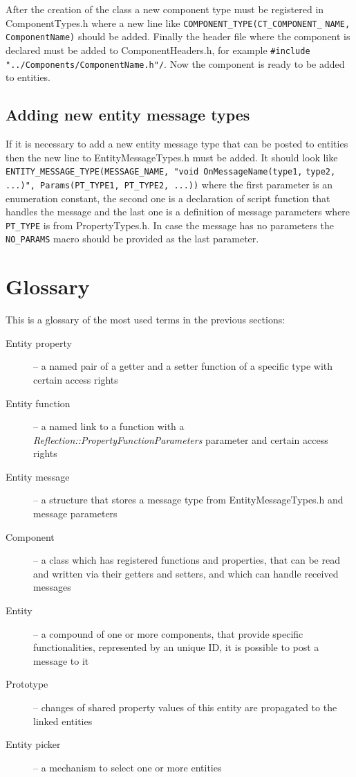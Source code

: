 After the creation of the class a new component type must be registered in ComponentTypes.h where a new line like \verb/COMPONENT_TYPE(CT_COMPONENT_/ \verb/NAME, ComponentName)/ should be added. Finally the header file where the component is declared must be added to ComponentHeaders.h, for example \verb|#include "../Components/ComponentName.h"/|. Now the component is ready to be added to entities.

\subsection{Adding new entity message types}
\label{sub:entity-newmessages}

If it is necessary to add a new entity message type that can be posted to entities then the new line to EntityMessageTypes.h must be added. It should look like \verb/ENTITY_MESSAGE_TYPE(MESSAGE_NAME, "void OnMessageName(type1,/
\verb/type2, ...)", Params(PT_TYPE1, PT_TYPE2, ...))/ where the first parameter is an enumeration constant, the second one is a declaration of script function that handles the message and the last one is a definition of message parameters where \verb/PT_TYPE/ is from PropertyTypes.h. In case the message has no parameters the \verb/NO_PARAMS/ macro should be provided as the last parameter.

\section{Glossary}

This is a glossary of the most used terms in the previous sections:

\begin{description}
  \item[Entity property] -- a named pair of a getter and a setter function of a specific type with certain access rights
  \item[Entity function] -- a named link to a function with a \emph{Reflection::Property\-FunctionParameters} parameter and certain access rights
  \item[Entity message] -- a structure that stores a message type from EntityMessageTypes.h and message parameters
  \item[Component] -- a class which has registered functions and properties, that can be read and written via their getters and setters, and which can handle received messages
  \item[Entity] -- a compound of one or more components, that provide specific functionalities, represented by an unique ID, it is possible to post a message to it
  \item[Prototype] -- changes of shared property values of this entity are propagated to the linked entities
  \item[Entity picker] -- a mechanism to select one or more entities
\end{description}